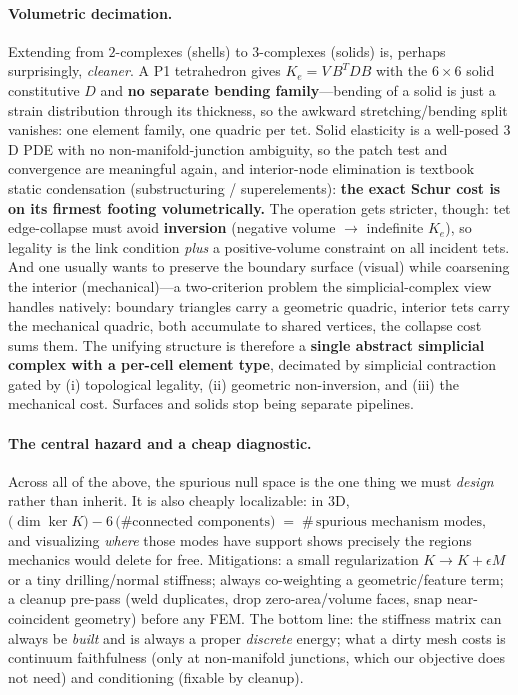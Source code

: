 \paragraph{Volumetric decimation.}
Extending from $2$-complexes (shells) to $3$-complexes (solids) is, perhaps surprisingly, \emph{cleaner}.
A P1 tetrahedron gives $K_e = V\,B^T D B$ with the $6\times6$ solid constitutive $D$ and \textbf{no separate bending family}---bending of a solid is just a strain distribution through its thickness, so the awkward stretching/bending split vanishes: one element family, one quadric per tet.
Solid elasticity is a well-posed $3$D PDE with no non-manifold-junction ambiguity, so the patch test and convergence are meaningful again, and interior-node elimination is textbook static condensation (substructuring / superelements): \textbf{the exact Schur cost is on its firmest footing volumetrically.}
The operation gets stricter, though: tet edge-collapse must avoid \textbf{inversion} (negative volume $\to$ indefinite $K_e$), so legality is the link condition \emph{plus} a positive-volume constraint on all incident tets.
And one usually wants to preserve the boundary surface (visual) while coarsening the interior (mechanical)---a two-criterion problem the simplicial-complex view handles natively: boundary triangles carry a geometric quadric, interior tets carry the mechanical quadric, both accumulate to shared vertices, the collapse cost sums them.
The unifying structure is therefore a \textbf{single abstract simplicial complex with a per-cell element type}, decimated by simplicial contraction gated by (i) topological legality, (ii) geometric non-inversion, and (iii) the mechanical cost.
Surfaces and solids stop being separate pipelines.

\paragraph{The central hazard and a cheap diagnostic.}
Across all of the above, the spurious null space is the one thing we must \emph{design} rather than inherit.
It is also cheaply localizable: in $3$D, $ \big(\dim\ker K\big) - 6\,\big(\#\text{connected components}\big) \;=\; \#\,\text{spurious mechanism modes,} $ and visualizing \emph{where} those modes have support shows precisely the regions mechanics would delete for free.
Mitigations: a small regularization $K \to K + \epsilon M$ or a tiny drilling/normal stiffness; always co-weighting a geometric/feature term; a cleanup pre-pass (weld duplicates, drop zero-area/volume faces, snap near-coincident geometry) before any FEM.
The bottom line: the stiffness matrix can always be \emph{built} and is always a proper \emph{discrete} energy; what a dirty mesh costs is continuum faithfulness (only at non-manifold junctions, which our objective does not need) and conditioning (fixable by cleanup).

